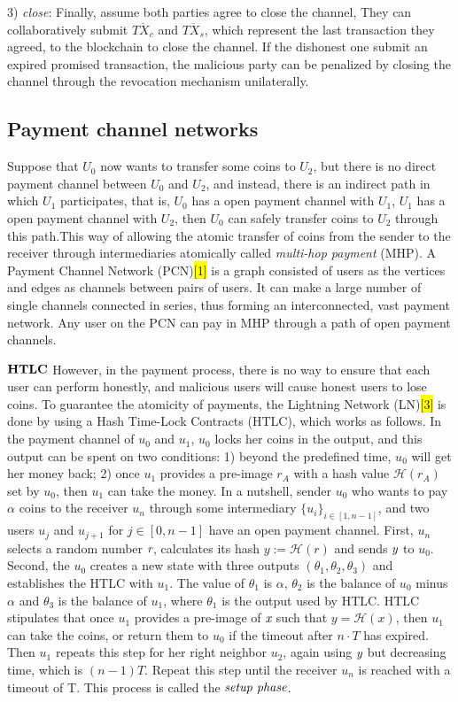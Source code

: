 \documentclass[conference]{IEEEtran}
\begin{document}
3) \emph{close}: Finally, assume both parties agree to close the channel, They can collaboratively submit $\overline{TX_c}$ and $\overline{TX_s}$, which represent the last transaction they agreed, to the blockchain to close the channel. If the dishonest one submit an expired promised transaction, the malicious party can be penalized by closing the channel through the revocation mechanism unilaterally.

\subsection{Payment channel networks}
Suppose that $U_0$ now wants to transfer some coins to $U_2$, but there is no direct payment channel between $U_0$ and $U_2$, and instead, there is an indirect path in which $U_1$ participates, that is, $U_0$ has a open payment channel with $U_1$, $U_1$ has a open payment channel with $U_2$, then $U_0$ can safely transfer coins to $U_2$ through this path.This way of allowing the atomic transfer of coins 
from the sender to the receiver through intermediaries atomically called \emph{multi-hop payment} (MHP). A Payment Channel Network (PCN)\colorbox{yellow}{[1]} is a graph consisted of users as the vertices and edges as channels between pairs of users. It can make a large number of single channels connected in series, thus forming an interconnected, vast payment network. Any user on the PCN can pay in MHP through a path of open payment channels. 

\noindent $\bf{HTLC}$ However, in the payment process, there is no way to ensure that each user can perform honestly, and malicious users will cause honest users to lose coins. To guarantee the atomicity of payments, the Lightning Network (LN)\colorbox{yellow}{[3]} is done by using a Hash Time-Lock Contracts (HTLC), which works as follows. In the payment channel of $u_0$ and $u_1$, $u_0$ locks her coins in 
the output, and this output can be spent on two conditions: 1) beyond the predefined time, $u_0$ will get her money back; 2) once $u_1$ provides a pre-image $r_A$ with a hash value $\mathcal H(r_A)$ set by $u_0$, then $u_1$ can take the money. In a nutshell, sender $u_0$ who wants to pay $\alpha$ coins to the receiver $u_n$ through some intermediary ${\{u_i\}}_{i\in[1,n-1]}$, and two users $u_j$ and $u_{j+1}$ for 
$j \in [0,n-1]$ have an open payment channel. First, $u_n$ selects a random number $\emph{r}$, calculates its hash $y:= \mathcal H(r)$ and sends $\emph{y}$ to $u_0$. Second, the $u_0$ creates a new state with three outputs $(\theta_1, \theta_2, \theta_3)$ and establishes the HTLC with $u_1$. The value of $\theta_1$ is $\alpha$, $\theta_2$ is the balance of $u_0$ minus $\alpha$ and $\theta_3$ is the balance of $u_1$, where $\theta_1$ is the output used by HTLC. HTLC stipulates that once $u_1$ provides a pre-image of $\emph{x}$ such that $y = \mathcal H(x)$, then $u_1$ can take the coins, or return them to $u_0$ if the timeout after $n\cdot T$ has expired. Then $u_1$ repeats this step for her right neighbor $u_2$, again using $\emph{y}$ but decreasing time, which is $(n-1)T$. Repeat this step until the receiver $u_n$ is reached with a timeout of T. This process is called the $\emph{setup phase}$. 
\end{document}
